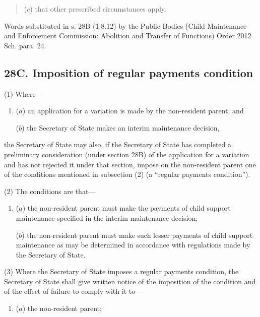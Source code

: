 \documentclass[a4paper]{article}
\begin{document}
{{\begin{quotation}
\begin{enumerate}

($c$) that other prescribed circumstances apply.
\end{enumerate}
\end{quotation}


Words substituted in s. 28B (1.8.12) by the Public Bodies (Child Maintenance and Enforcement Commission: Abolition and Transfer of Functions) Order 2012 Sch. para. 24.
}

\subsection{28C. Imposition of regular payments condition}

(1) Where---
\begin{enumerate}\item[]
($a$) an application for a variation is made by the non-resident parent; and

($b$) the Secretary of State makes an interim maintenance decision,
\end{enumerate}
the Secretary of State may also, if the Secretary of State has completed a
preliminary consideration (under section 28B) of the application for a variation
and has not rejected it under that section, impose on the non-resident parent one of
the conditions mentioned in subsection (2) (a “regular payments condition”).

(2) The conditions are that---
\begin{enumerate}\item[]
($a$) the non-resident parent must make the payments of child support
maintenance specified in the interim maintenance decision;

($b$) the non-resident parent must make such lesser payments of child support
maintenance as may be determined in accordance with regulations made
by the Secretary of State.
\end{enumerate}

(3) Where the Secretary of State imposes a regular payments condition, the
Secretary of State shall give written notice of the imposition of the condition and of
the effect of failure to comply with it to---
\begin{enumerate}\item[]
($a$) the non-resident parent;


\end{enumerate}}
\end{document}

